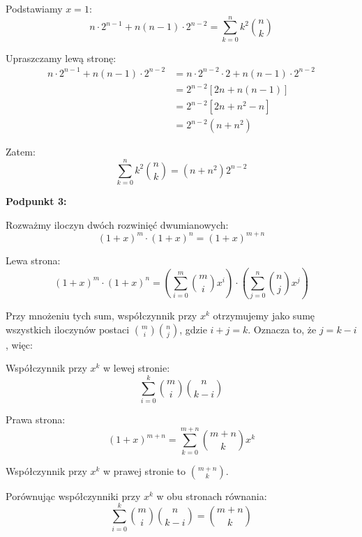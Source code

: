 \documentclass{mwart}
\begin{document}
\begin{mdframed}
\begin{enumerate}
        Podstawiamy $x = 1$:
        \begin{equation}
        n \cdot 2^{n-1} + n(n-1) \cdot 2^{n-2} = \sum_{k=0}^{n} k^2 \binom{n}{k}
        \end{equation}

        Upraszczamy lewą stronę:
        \begin{align}
        n \cdot 2^{n-1} + n(n-1) \cdot 2^{n-2} &= n \cdot 2^{n-2} \cdot 2 + n(n-1) \cdot 2^{n-2} \\
        &= 2^{n-2}[2n + n(n-1)] \\
        &= 2^{n-2}[2n + n^2 - n] \\
        &= 2^{n-2}(n + n^2)
        \end{align}

        Zatem:
        \begin{equation}
        \boxed{\sum_{k=0}^{n} k^2 \binom{n}{k} = (n + n^2)2^{n-2}}
        \end{equation}
        \newline

        \textbf{Podpunkt 3:}

        Rozważmy iloczyn dwóch rozwinięć dwumianowych:
        \begin{equation}
        (1+x)^m \cdot (1+x)^n = (1+x)^{m+n}
        \end{equation}

        Lewa strona:
        \begin{equation}
        (1+x)^m \cdot (1+x)^n = \left(\sum_{i=0}^{m} \binom{m}{i} x^i\right) \cdot \left(\sum_{j=0}^{n} \binom{n}{j} x^j\right)
        \end{equation}

        Przy mnożeniu tych sum, współczynnik przy $x^k$ otrzymujemy jako sumę wszystkich iloczynów postaci $\binom{m}{i} \binom{n}{j}$, gdzie $i + j = k$. Oznacza to, że $j = k - i$, więc:

        Współczynnik przy $x^k$ w lewej stronie:
        \begin{equation}
        \sum_{i=0}^{k} \binom{m}{i} \binom{n}{k-i}
        \end{equation}

        Prawa strona:
        \begin{equation}
        (1+x)^{m+n} = \sum_{k=0}^{m+n} \binom{m+n}{k} x^k
        \end{equation}

        Współczynnik przy $x^k$ w prawej stronie to $\binom{m+n}{k}$.

        Porównując współczynniki przy $x^k$ w obu stronach równania:
        \begin{equation}
        \boxed{\sum_{i=0}^{k} \binom{m}{i} \binom{n}{k-i} = \binom{m+n}{k}}
        \end{equation}
    \end{enumerate}
\end{mdframed}
\end{document}
